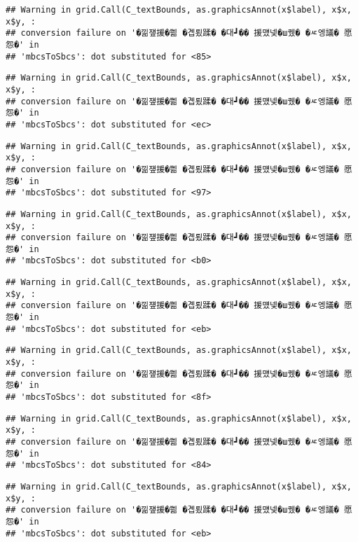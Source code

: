 \documentclass[
]{article}
\begin{document}
\begin{verbatim}
## Warning in grid.Call(C_textBounds, as.graphicsAnnot(x$label), x$x, x$y, :
## conversion failure on '�낆쟾援�쁾 �곕룄蹂� �대┛�� 援먰넻�ш퀬� �ㅼ엥議� 愿怨�' in
## 'mbcsToSbcs': dot substituted for <85>
\end{verbatim}

\begin{verbatim}
## Warning in grid.Call(C_textBounds, as.graphicsAnnot(x$label), x$x, x$y, :
## conversion failure on '�낆쟾援�쁾 �곕룄蹂� �대┛�� 援먰넻�ш퀬� �ㅼ엥議� 愿怨�' in
## 'mbcsToSbcs': dot substituted for <ec>
\end{verbatim}

\begin{verbatim}
## Warning in grid.Call(C_textBounds, as.graphicsAnnot(x$label), x$x, x$y, :
## conversion failure on '�낆쟾援�쁾 �곕룄蹂� �대┛�� 援먰넻�ш퀬� �ㅼ엥議� 愿怨�' in
## 'mbcsToSbcs': dot substituted for <97>
\end{verbatim}

\begin{verbatim}
## Warning in grid.Call(C_textBounds, as.graphicsAnnot(x$label), x$x, x$y, :
## conversion failure on '�낆쟾援�쁾 �곕룄蹂� �대┛�� 援먰넻�ш퀬� �ㅼ엥議� 愿怨�' in
## 'mbcsToSbcs': dot substituted for <b0>
\end{verbatim}

\begin{verbatim}
## Warning in grid.Call(C_textBounds, as.graphicsAnnot(x$label), x$x, x$y, :
## conversion failure on '�낆쟾援�쁾 �곕룄蹂� �대┛�� 援먰넻�ш퀬� �ㅼ엥議� 愿怨�' in
## 'mbcsToSbcs': dot substituted for <eb>
\end{verbatim}

\begin{verbatim}
## Warning in grid.Call(C_textBounds, as.graphicsAnnot(x$label), x$x, x$y, :
## conversion failure on '�낆쟾援�쁾 �곕룄蹂� �대┛�� 援먰넻�ш퀬� �ㅼ엥議� 愿怨�' in
## 'mbcsToSbcs': dot substituted for <8f>
\end{verbatim}

\begin{verbatim}
## Warning in grid.Call(C_textBounds, as.graphicsAnnot(x$label), x$x, x$y, :
## conversion failure on '�낆쟾援�쁾 �곕룄蹂� �대┛�� 援먰넻�ш퀬� �ㅼ엥議� 愿怨�' in
## 'mbcsToSbcs': dot substituted for <84>
\end{verbatim}

\begin{verbatim}
## Warning in grid.Call(C_textBounds, as.graphicsAnnot(x$label), x$x, x$y, :
## conversion failure on '�낆쟾援�쁾 �곕룄蹂� �대┛�� 援먰넻�ш퀬� �ㅼ엥議� 愿怨�' in
## 'mbcsToSbcs': dot substituted for <eb>
\end{verbatim}
\end{document}
